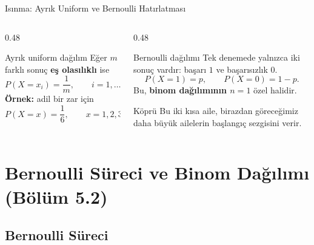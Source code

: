 \documentclass[light]{lutbeamer}
\begin{document}
\begin{frame}{Isınma: Ayrık Uniform ve Bernoulli Hatırlatması}
    \small
    \begin{columns}[T]
        \begin{column}{0.48\textwidth}
            \begin{block}{Ayrık uniform dağılım}
                Eğer \(m\) farklı sonuç \textbf{eş olasılıklı} ise
                \[
                P(X=x_i)=\frac{1}{m}, \qquad i=1,\dots,m.
                \]
                \textbf{Örnek:} adil bir zar için
                \[
                P(X=x)=\frac{1}{6}, \qquad x=1,2,3,4,5,6.
                \]
            \end{block}
        \end{column}
        \begin{column}{0.48\textwidth}
            \begin{block}{Bernoulli dağılımı}
                Tek denemede yalnızca iki sonuç vardır:
                başarı \(1\) ve başarısızlık \(0\).
                \[
                P(X=1)=p, \qquad P(X=0)=1-p.
                \]
                Bu, \textbf{binom dağılımının \(n=1\)} özel halidir.
            \end{block}

            \begin{alertblock}{Köprü}
                Bu iki kısa aile, birazdan göreceğimiz daha büyük ailelerin başlangıç sezgisini verir.
            \end{alertblock}
        \end{column}
    \end{columns}
\end{frame}

\section{Bernoulli Süreci ve Binom Dağılımı (Bölüm 5.2)}
\subsection{Bernoulli Süreci}
\end{document}
